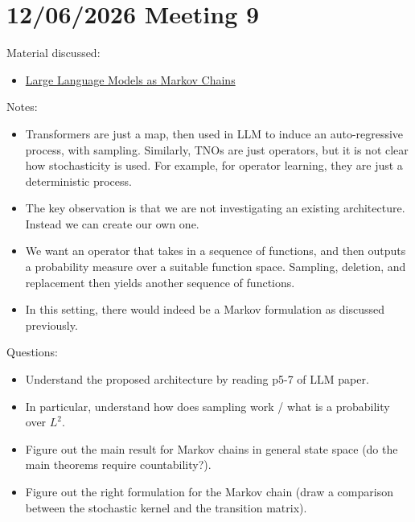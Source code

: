 \documentclass{article}
\begin{document}
\section{12/06/2026 Meeting 9}
Material discussed:
\begin{itemize}
    \item \href{https://arxiv.org/abs/2410.02724}{Large Language Models as Markov Chains}
    
\end{itemize}
Notes:
\begin{itemize}
    \item Transformers are just a map, then used in LLM to induce an auto-regressive process, with sampling. Similarly, TNOs are just operators, but it is not clear how stochasticity is used. For example, for operator learning, they are just a deterministic process.
    \item The key observation is that we are not investigating an existing architecture. Instead we can create our own one.
    \item We want an operator that takes in a sequence of functions, and then outputs a probability measure over a suitable function space. Sampling, deletion, and replacement then yields another sequence of functions.
    \item In this setting, there would indeed be a Markov formulation as discussed previously.
\end{itemize}
Questions:
\begin{itemize}
    \item Understand the proposed architecture by reading p5-7 of LLM paper.
    \item In particular, understand how does sampling work / what is a probability over $L^2$.
    \item Figure out the main result for Markov chains in general state space (do the main theorems require countability?).
    \item Figure out the right formulation for the Markov chain (draw a comparison between the stochastic kernel and the transition matrix).
\end{itemize}
\end{document}
